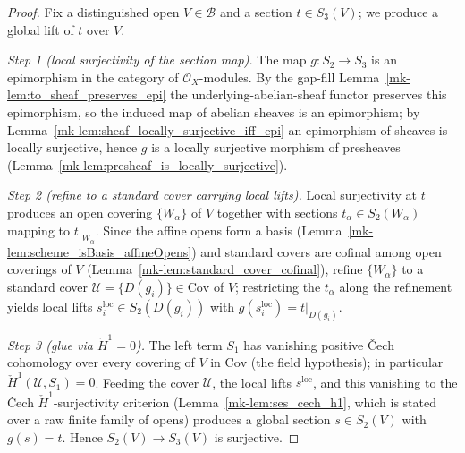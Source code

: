 \begin{proof}
  \leanok
    Fix a distinguished open \(V \in \mathcal{B}\) and a section \(t \in S_3(V)\); we produce a global
  lift of \(t\) over \(V\).

  \emph{Step 1 (local surjectivity of the section map).} The map \(g : S_2 \to S_3\) is an
  epimorphism in the category of \(\mathcal{O}_X\)-modules. By the gap-fill
  Lemma~\ref{mk-lem:to_sheaf_preserves_epi} the underlying-abelian-sheaf functor preserves this
  epimorphism, so the induced map of abelian sheaves is an epimorphism; by
  Lemma~\ref{mk-lem:sheaf_locally_surjective_iff_epi} an epimorphism of sheaves is locally surjective,
  hence \(g\) is a locally surjective morphism of presheaves
  (Lemma~\ref{mk-lem:presheaf_is_locally_surjective}).

  \emph{Step 2 (refine to a standard cover carrying local lifts).} Local surjectivity at \(t\)
  produces an open covering \(\{W_\alpha\}\) of \(V\) together with sections
  \(t_\alpha \in S_2(W_\alpha)\) mapping to \(t|_{W_\alpha}\). Since the affine opens form a basis
  (Lemma~\ref{mk-lem:scheme_isBasis_affineOpens}) and standard covers are cofinal among open coverings
  of \(V\) (Lemma~\ref{mk-lem:standard_cover_cofinal}), refine \(\{W_\alpha\}\) to a standard cover
  \(\mathcal{U} = \{D(g_i)\} \in \mathrm{Cov}\) of \(V\); restricting the \(t_\alpha\) along the
  refinement yields local lifts \(s^{\mathrm{loc}}_i \in S_2(D(g_i))\) with
  \(g(s^{\mathrm{loc}}_i) = t|_{D(g_i)}\).

  \emph{Step 3 (glue via \(\check{H}^1 = 0\)).} The left term \(S_1\) has vanishing positive
  {\v C}ech cohomology over every covering of \(V\) in \(\mathrm{Cov}\) (the field hypothesis); in
  particular \(\check{H}^1(\mathcal{U}, S_1) = 0\). Feeding the cover \(\mathcal{U}\), the local lifts
  \(s^{\mathrm{loc}}\), and this vanishing to the {\v C}ech \(\check{H}^1\)-surjectivity criterion
  (Lemma~\ref{mk-lem:ses_cech_h1}, which is stated over a raw finite family of opens) produces a global
  section \(s \in S_2(V)\) with \(g(s) = t\). Hence \(S_2(V) \to S_3(V)\) is surjective.
\end{proof}

